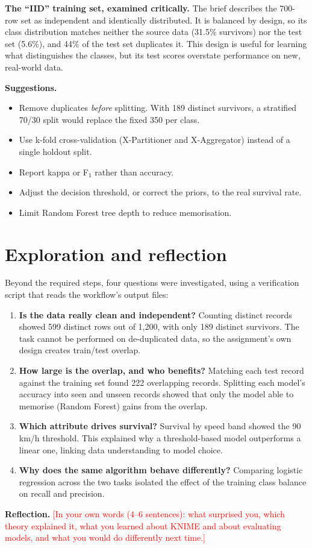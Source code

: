 \documentclass[11pt,a4paper]{article}
\newcommand{\fillin}[1]{\textcolor{Red}{[#1]}}
\begin{document}
\textbf{The ``IID'' training set, examined critically.} The brief describes the 700-row set as independent and
identically distributed. It is balanced by design, so its class distribution matches neither the source data (31.5\%
survivors) nor the test set (5.6\%), and 44\% of the test set duplicates it. This design is useful for learning what
distinguishes the classes, but its test scores overstate performance on new, real-world data.

\textbf{Suggestions.}
\begin{itemize}
  \item Remove duplicates \emph{before} splitting. With 189 distinct survivors, a stratified 70/30 split would replace
        the fixed 350 per class.
  \item Use k-fold cross-validation (X-Partitioner and X-Aggregator) instead of a single holdout split.
  \item Report kappa or F$_1$ rather than accuracy.
  \item Adjust the decision threshold, or correct the priors, to the real survival rate.
  \item Limit Random Forest tree depth to reduce memorisation.
\end{itemize}

\section{Exploration and reflection}\label{sec:explore}
Beyond the required steps, four questions were investigated, using a verification script that reads the workflow's
output files:
\begin{enumerate}
  \item \textbf{Is the data really clean and independent?} Counting distinct records showed 599 distinct rows out of
        1,200, with only 189 distinct survivors. The task cannot be performed on de-duplicated data, so the assignment's
        own design creates train/test overlap.
  \item \textbf{How large is the overlap, and who benefits?} Matching each test record against the training set found
        222 overlapping records. Splitting each model's accuracy into seen and unseen records showed that only the model
        able to memorise (Random Forest) gains from the overlap.
  \item \textbf{Which attribute drives survival?} Survival by speed band showed the 90\,km/h threshold. This explained
        why a threshold-based model outperforms a linear one, linking data understanding to model choice.
  \item \textbf{Why does the same algorithm behave differently?} Comparing logistic regression across the two tasks
        isolated the effect of the training class balance on recall and precision.
\end{enumerate}
\textbf{Reflection.} \fillin{In your own words (4--6 sentences): what surprised you, which theory explained it, what
you learned about KNIME and about evaluating models, and what you would do differently next time.}
\end{document}
